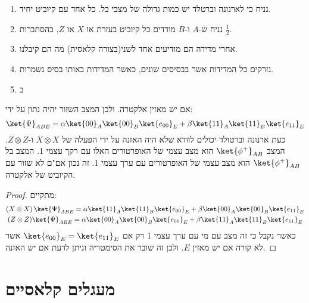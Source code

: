 \documentclass{tstextbook}
\begin{document}
\begin{proposition}
  \begin{enumerate}
    \item נניח כי לארנונה וברטלד יש כמות גדולה של מצבי בל. כל אחד עם קיוביט יחיד. 


    \item נניח ש-\(A\) ו-\(B\) מודדים כל קיוביט בעזרת או \(X\) או \(Z\), בהסתברות \(\frac{1}{2}\).  


    \item אחרי מדידה הם מודיעים אחד לשני(בצורה קלאסית) מה הם קיבלנו. 


    \item נזרקים כל המדידות אשר בבסיסים שונים, כאשר המדידות באותו בסיס נשמרות. 


    \item ב 


  \end{enumerate}
\end{proposition}
\begin{proposition}
אם יש מאזין אלקטרה. ולכן המצב השזור יהיה נתון על ידי:
$$\ket{\Psi}_{ABE} = \alpha\ket{00}_{A}\ket{00}_{B}\ket{e_{00}}_{E}+\beta\ket{11}_{A}\ket{11}_{B}\ket{e_{11}}_{E}$$
כעת ארנונה וברטולד יכולים לוודא שלא היה האזנה על ידי הפעלה של \(X\otimes X\) ו-\(Z \otimes Z\). המצב \(\ket{\phi^{+}}_{AB}\) הוא מצב עצמי של האופרטורים האלו עם רקך עצמי 1.  המצב בל \(\ket{\phi^{+}}_{AB}\) הוא מצב עצמי של האופרטורים עם ערך עצמי 1. זה נכון אם"ם לא שזור עם הקיוביט של אלקטרה.

\end{proposition}
\begin{proof}
מתקיים:
$$\begin{gather}\left( X \otimes X \right) \ket{\Psi}_{ABE} = \alpha\ket{11}_{A}\ket{11}_{B}\ket{e_{00}}_{E}+\beta\ket{00}_{A}\ket{00}_{B}\ket{e_{11}}_{E}  \\(Z \otimes Z) \ket{\Psi}_{ABE} = \alpha\ket{00}_{A}\ket{00}_{B}\ket{e_{00}}_{E}+\beta\ket{11}_{A}\ket{11}_{B}\ket{e_{11}}_{E}
\end{gather}$$
כאשר נקבל כי זה מצב עם מי עם ערך עצמי 1 רק אם \(\ket{e_{00}}_E = \ket{e_{11}}_E\) אשר לא קורה אם יש מאזין \(E\). ולכן זה שובר את הסימטריה וניתן לדעת אם יש האזנה.

\end{proof}
\section{מעגלים קלאסיים}
\end{document}
